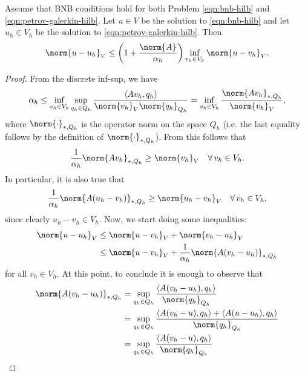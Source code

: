 \begin{lemma}\label{lemma:cea-petrov-galerkin}
    Assume that BNB conditions hold for both Problem \eqref{eqn:bnb-hilb} and \eqref{eqn:petrov-galerkin-hilb}. Let $u\in V$ be the solution to \eqref{eqn:bnb-hilb} and let $u_h\in V_h$ be the solution to \eqref{eqn:petrov-galerkin-hilb}. Then
    \begin{equation*}
        \norm{u-u_h}_V\leq\left( 1+\frac{\norm{A}}{\alpha_h} \right)\inf_{v_h\in V_h}\norm{u-v_h}_V.
    \end{equation*}
\end{lemma}
\begin{proof}
    From the discrete inf-sup, we have
    \begin{equation*}
        \alpha_h\leq \inf_{v_h\in V_h}\sup_{q_h\in Q_h}\frac{\langle Av_h,q_h \rangle}{\norm{v_h}_V\norm{q_h}_{Q_h}}= \inf_{v_h\in V_h}\frac{\norm{Av_h}_{*,Q_h}}{\norm{v_h}_V},
    \end{equation*}
    where $\norm{\cdot}_{*,Q_h}$ is the operator norm on the space $Q_h$ (i.e. the last equality follows by the definition of $\norm{\cdot}_{*,Q_h}$). From this follows that
    \begin{equation*}
        \frac{1}{\alpha_h}\norm{Av_h}_{*,Q_h}\geq\norm{v_h}_V \quad \forall\, v_h\in V_h.
    \end{equation*}
    In particular, it is also true that
    \begin{equation*}
        \frac{1}{\alpha_h}\norm{A(u_h-v_h)}_{*,Q_h}\geq\norm{u_h-v_h}_V \quad \forall\, v_h\in V_h,
    \end{equation*}
    since clearly $u_h-v_h\in V_h$. Now, we start doing some inequalities:
    \begin{align*}
        \norm{u-u_h}_V&\leq\norm{u-v_h}_V+\norm{v_h-u_h}_V\\
        &\leq\norm{u-v_h}_V+\frac{1}{\alpha_h}\norm{A(v_h-u_h)}_{*,Q_h}
    \end{align*}
    for all $v_h\in V_h$. At this point, to conclude it is enough to observe that
    \begin{align*}
        \norm{A(v_h-u_h)}_{*,Q_h}&=\sup_{q_h\in Q_h}\frac{\langle A(v_h-u_h),q_h \rangle}{\norm{q_h}_{Q_h}}\\
        &=\sup_{q_h\in Q_h}\frac{\langle A(v_h-u),q_h \rangle + \langle A(u-u_h),q_h\rangle}{\norm{q_h}_{Q_h}}\\
        &=\sup_{q_h\in Q_h}\frac{\langle A(v_h-u),q_h \rangle}{\norm{q_h}_{Q_h}}\\

\end{align*}
\end{proof}
